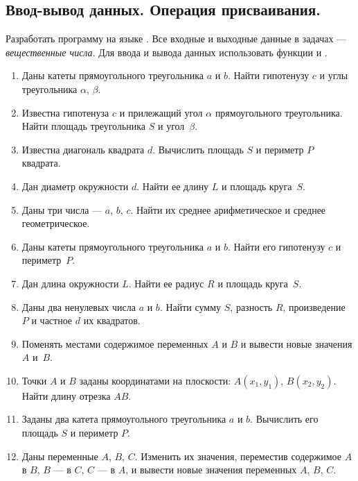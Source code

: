 \subsection[Ввод-вывод данных. Операция присваивания.]{Ввод-вывод данных. Операция присваивания.}
Разработать программу на языке . Все входные и выходные данные в задачах --- \emph{вещественные числа}.
Для ввода и вывода данных использовать функции  и .
\begin{enumerate}
\item Даны катеты прямоугольного треугольника $a$ и $b$. Найти гипотенузу
$c$ и углы треугольника ${\alpha}$, ${\beta}$.

\item Известна гипотенуза $c$ и прилежащий угол ${\alpha}$ прямоугольного
треугольника. Найти площадь треугольника $S$ и угол~${\beta}$.

\item Известна диагональ квадрата $d$. Вычислить площадь $S$ и периметр
$P$ квадрата.

\item Дан диаметр окружности $d$. Найти ее длину $L$ и площадь круга~$S$.

\item Даны три числа --- $a$, $b$, $c$. Найти их среднее
арифметическое и среднее геометрическое.

\item Даны катеты прямоугольного треугольника $a$ и $b$. Найти его гипотенузу
$c$ и периметр~$P$.

\item Дан длина окружности $L$. Найти ее радиус $R$ и площадь круга~$S$.

\item Даны два ненулевых числа $a$ и $b$. Найти сумму $S$,
разность $R$, произведение $P$ и частное $d$ их квадратов.

\item Поменять местами содержимое переменных $A$ и $B$ и вывести новые значения $A$ и~$B$.

\item Точки $A$ и $B$ заданы координатами на плоскости:
$A(x_1,y_1)$, $B(x_2,y_2)$. Найти длину отрезка $AB$.

\item Заданы два катета прямоугольного треугольника $a$ и $b$. Вычислить его
площадь $S$ и периметр $P$.

\item Даны переменные $A$, $B$, $C$. Изменить их значения,
переместив содержимое $A$ в $B$, $B$ --- в $C$,
$C$ --- в $A$, и вывести новые значения переменных $A$,
$B$, $C$.


\end{enumerate}
